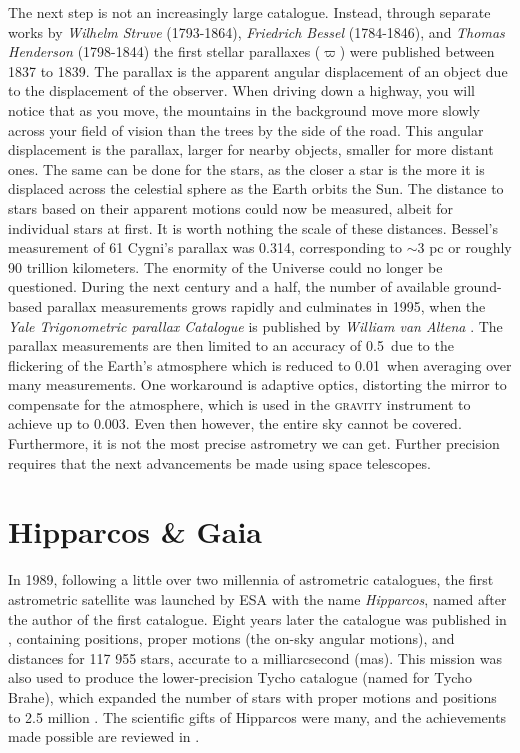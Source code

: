 The next step is not an increasingly large catalogue. Instead, through separate works by \textit{Wilhelm Struve} (1793-1864), \textit{Friedrich Bessel} (1784-1846), and \textit{Thomas Henderson} (1798-1844) the first stellar parallaxes ($\varpi$) were published between 1837 to 1839. The parallax is the apparent angular displacement of an object due to the displacement of the observer. When driving down a highway, you will notice that as you move, the mountains in the background move more slowly across your field of vision than the trees by the side of the road. This angular displacement is the parallax, larger for nearby objects, smaller for more distant ones. The same can be done for the stars, as the closer a star is the more it is displaced across the celestial sphere as the Earth orbits the Sun. The distance to stars based on their apparent motions could now be measured, albeit for individual stars at first. It is worth nothing the scale of these distances. Bessel's measurement of 61 Cygni's parallax was 0.314\as, corresponding to ${\sim}3$ pc or roughly 90 trillion kilometers. The enormity of the Universe could no longer be questioned. During the next century and a half, the number of available ground-based parallax measurements grows rapidly and culminates in 1995, when the \textit{Yale Trigonometric parallax Catalogue} is published by \textit{William van Altena} \citep{vanaltena:95}. The parallax measurements are then limited to an accuracy of 0.5\as\ due to the flickering of the Earth's atmosphere which is reduced to 0.01\as\ when averaging over many measurements. One workaround is adaptive optics, distorting the mirror to compensate for the atmosphere, which is used in the \textsc{gravity} instrument \citep{gravity:11} to achieve up to 0.003\as. Even then however, the entire sky cannot be covered. Furthermore, it is not the most precise astrometry we can get. Further precision requires that the next advancements be made using space telescopes.

\section{Hipparcos \& Gaia}\label{sec:gaia}
In 1989, following a little over two millennia of astrometric catalogues, the first astrometric satellite was launched by ESA with the name \textit{Hipparcos}, named after the author of the first catalogue. Eight years later the catalogue was published in \cite{perryman:97}, containing positions, proper motions (the on-sky angular motions), and distances for 117 955 stars, accurate to a milliarcsecond (mas). This mission was also used to produce the lower-precision Tycho catalogue (named for Tycho Brahe), which expanded the number of stars with proper motions and positions to 2.5 million \citep{hog:00}. The scientific gifts of Hipparcos were many, and the achievements made possible are reviewed in \cite{perryman:09}. 

